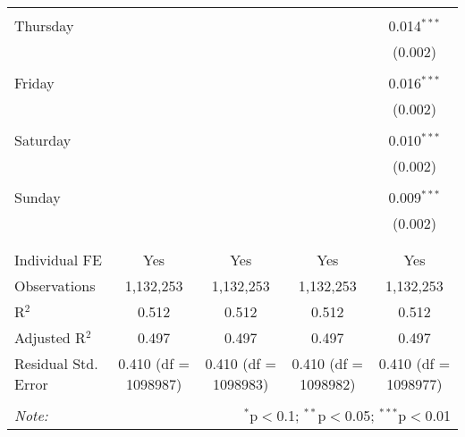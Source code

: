 \documentclass[
]{article}
\begin{document}
\begin{table}[!htbp]
{\begin{tabular}{@{\extracolsep{5pt}}lcccc}
  & & & & \\ 
 Thursday &  &  &  & 0.014$^{***}$ \\ 
  &  &  &  & (0.002) \\ 
  & & & & \\ 
 Friday &  &  &  & 0.016$^{***}$ \\ 
  &  &  &  & (0.002) \\ 
  & & & & \\ 
 Saturday &  &  &  & 0.010$^{***}$ \\ 
  &  &  &  & (0.002) \\ 
  & & & & \\ 
 Sunday &  &  &  & 0.009$^{***}$ \\ 
  &  &  &  & (0.002) \\ 
  & & & & \\ 
\hline \\[-1.8ex] 
Individual FE & Yes & Yes & Yes & Yes \\ 
Observations & 1,132,253 & 1,132,253 & 1,132,253 & 1,132,253 \\ 
R$^{2}$ & 0.512 & 0.512 & 0.512 & 0.512 \\ 
Adjusted R$^{2}$ & 0.497 & 0.497 & 0.497 & 0.497 \\ 
Residual Std. Error & 0.410 (df = 1098987) & 0.410 (df = 1098983) & 0.410 (df = 1098982) & 0.410 (df = 1098977) \\ 
\hline 
\hline \\[-1.8ex] 
\textit{Note:}  & \multicolumn{4}{r}{$^{*}$p$<$0.1; $^{**}$p$<$0.05; $^{***}$p$<$0.01} \\ 
\end{tabular}
} 
\end{table} 
\newpage
\end{document}
